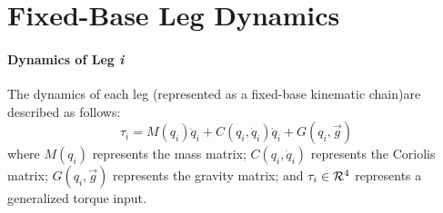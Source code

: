 \vspace{-10mm}
\chapter{Fixed-Base Leg Dynamics}
\label{appendix::b}
	\vspace{-5mm}


	\subsubsection{Dynamics of Leg \emph{i}}

	The dynamics of each \Ith leg (represented as a fixed-base kinematic chain)are described as follows:	
		\begin{equation*}
			\tau_{i} = M(q_{i})\ddot{q}_{i} + C(q_{i},\dot{q}_{i})\dot{q}_{i} + G(q_{i},\vec{g})
		\end{equation*}
	where $M(q_{i})$ represents the mass matrix; $C(q_{i},\dot{q}_{i})$ represents the Coriolis matrix; $G(q_{i},\vec{g})$ represents the gravity matrix; and $\tau_{i}\in{\cal R}^{4}$ represents a generalized torque input. %

